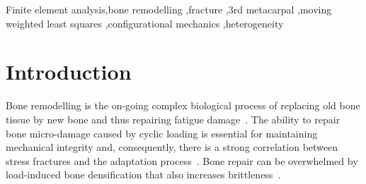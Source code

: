 \documentclass[review]{elsarticle}
\numberwithin{equation}{section}
\begin{document}
\begin{frontmatter}

\begin{keyword}	
Finite element analysis\sep bone remodelling \sep fracture \sep 3rd metacarpal \sep moving weighted least squares \sep configurational mechanics \sep heterogeneity
\end{keyword}
%
\end{frontmatter}

\linenumbers

\section{Introduction}
Bone remodelling is the on-going complex biological process of replacing old bone tissue by new bone and thus repairing fatigue damage~\citep{hughes2017role}.
The ability to repair bone micro-damage caused by cyclic loading is essential for maintaining mechanical integrity and, consequently, there is a strong correlation between stress fractures and the adaptation process~\citep{hughes2017role}. Bone repair can be overwhelmed by load-induced bone densification that also increases brittleness~\citep{loughridge2017qualitative}.
\end{document}
